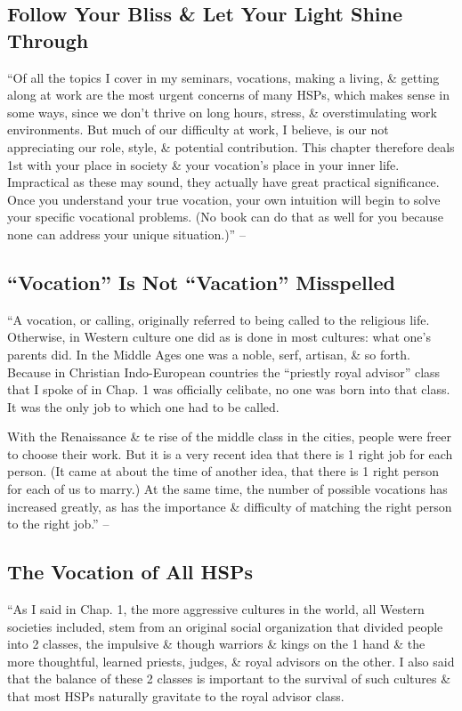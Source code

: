 \documentclass{article}
\numberwithin{equation}{section}
\begin{document}
\subsection{Follow Your Bliss \& Let Your Light Shine Through}
``Of all the topics I cover in my seminars, vocations, making a living, \& getting along at work are the most urgent concerns of many HSPs, which makes sense in some ways, since we don't thrive on long hours, stress, \& overstimulating work environments. But much of our difficulty at work, I believe, is our not appreciating our role, style, \& potential contribution. This chapter therefore deals 1st with your place in society \& your vocation's place in your inner life. Impractical as these may sound, they actually have great practical significance. Once you understand your true vocation, your own intuition will begin to solve your specific vocational problems. (No book can do that as well for you because none can address your unique situation.)'' -- \cite[p. 147]{Aron2013}

\subsection{``Vocation'' Is Not ``Vacation'' Misspelled}
``A vocation, or calling, originally referred to being called to the religious life. Otherwise, in Western culture one did as is done in most cultures: what one's parents did. In the Middle Ages one was a noble, serf, artisan, \& so forth. Because in Christian Indo-European countries the ``priestly royal advisor'' class that I spoke of in Chap. 1 was officially celibate, no one was born into that class. It was the only job to which one had to be called.

With the Renaissance \& te rise of the middle class in the cities, people were freer to choose their work. But it is a very recent idea that there is 1 right job for each person. (It came at about the time of another idea, that there is 1 right person for each of us to marry.) At the same time, the number of possible vocations has increased greatly, as has the importance \& difficulty of matching the right person to the right job.'' -- \cite[p. 147]{Aron2013}

\subsection{The Vocation of All HSPs}
``As I said in Chap. 1, the more aggressive cultures in the world, all Western societies included, stem from an original social organization that divided people into 2 classes, the impulsive \& though warriors \& kings on the 1 hand \& the more thoughtful, learned priests, judges, \& royal advisors on the other. I also said that the balance of these 2 classes is important to the survival of such cultures \& that most HSPs naturally gravitate to the royal advisor class.
\end{document}
